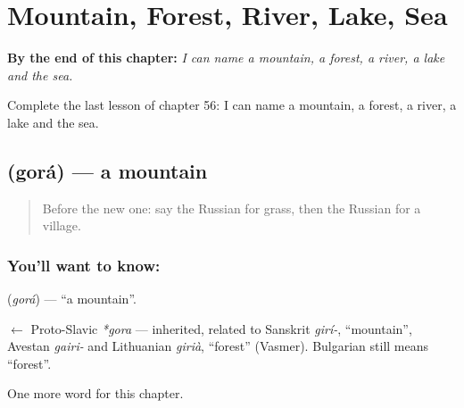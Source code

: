 
\chapter{Mountain, Forest, River, Lake, Sea}
\label{ch:ru-mountain-forest-river-lake-sea}

\begin{chapteropening}
\textbf{By the end of this chapter:} \emph{I can name a mountain, a forest, a river, a lake and the sea.}

Complete the last lesson of chapter 56: I can name a mountain, a forest, a river, a lake and the sea.
\end{chapteropening}

\section[\texorpdfstring{\ru{гора} (gorá)}{гора (gorá)}]{ (gorá) — a mountain}

\label{lesson:RU-C56-mountain}



\begin{quote}
Before the new one: say the Russian for grass, then the Russian for a village.
\end{quote}

\subsection*{You'll want to know: }
\textbf{} (\emph{gorá}) — \textquotedblleft{}a mountain\textquotedblright{}.

\begin{cousinweb}
\textbf{} $\leftarrow$ Proto-Slavic \emph{*gora} — inherited, related to Sanskrit \emph{girí-}, \textquotedblleft{}mountain\textquotedblright{}, Avestan \emph{gairi-} and Lithuanian \emph{girià}, \textquotedblleft{}forest\textquotedblright{} (Vasmer). Bulgarian \emph{} still means \textquotedblleft{}forest\textquotedblright{}.
\end{cousinweb}

\begin{grammarlens}[title={What you've built}]
One more word for this chapter.
\end{grammarlens}

